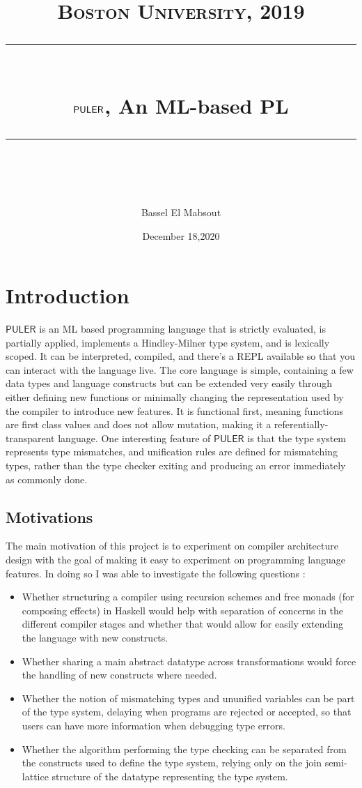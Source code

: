 \documentclass{article} %
\title{
\normalfont \normalsize 
\textsc{Boston University, 2019} \\
[10pt] 
\rule{\linewidth}{0.5pt} \\[6pt] 
\huge $\PULER$, An ML-based PL \\
\rule{\linewidth}{2pt}  \\[10pt]
}
\author{Bassel El Mabsout}
\date{\normalsize December 18,2020}
\newcommand{\PULER}{\mathsf{PULER}}
\begin{document}
\maketitle
\noindent

\tableofcontents

\newpage

\section{Introduction}
    $\PULER$ is an ML based programming language that is strictly evaluated, is partially applied, implements a Hindley-Milner type system, and is lexically scoped. It can be interpreted, compiled, and there's a REPL available so that you can interact with the language live. The core language is simple, containing a few data types and language constructs but can be extended very easily through either defining new functions or minimally changing the representation used by the compiler to introduce new features. It is functional first, meaning functions are first class values and does not allow mutation, making it a referentially-transparent language. One interesting feature of $\PULER$ is that the type system represents type mismatches, and unification rules are defined for mismatching types, rather than the type checker exiting and producing an error immediately as commonly done.
    \subsection{Motivations}
        The main motivation of this project is to experiment on compiler architecture design with the goal of making it easy to experiment on programming language features. In doing so I was able to investigate the following questions \cite{_latex_2015}:
    \begin{itemize}
        \item Whether structuring a compiler using recursion schemes and free monads (for composing effects) in Haskell would help with separation of concerns in the different compiler stages and whether that would allow for easily extending the language with new constructs.
        \item Whether sharing a main abstract datatype across transformations would force the handling of new constructs where needed.
        \item Whether the notion of mismatching types and ununified variables can be part of the type system, delaying when programs are rejected or accepted, so that users can have more information when debugging type errors.
        \item Whether the algorithm performing the type checking can be separated from the constructs used to define the type system, relying only on the join semi-lattice structure of the datatype representing the type system.
    \end{itemize}
\end{document}
